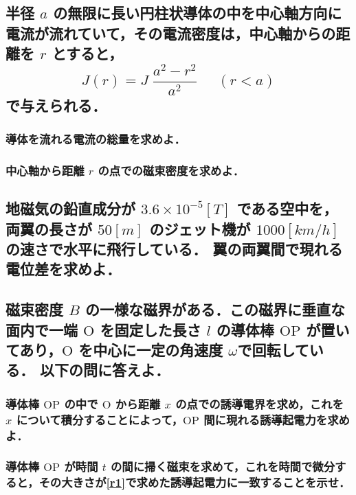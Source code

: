 \documentclass[a4paper, 12pt]{bxjsarticle}
\begin{document}
\newpage
\begin{samepage}
\subsection{半径 \(a\) の無限に長い円柱状導体の中を中心軸方向に電流が流れていて，その電流密度は，中心軸からの距離を \(r\) とすると，\[
    J(r) = J\;\frac{a^2-r^2}{a^2}\;\;\;\;\;(r < a)\]で与えられる．}
\subsubsection{導体を流れる電流の総量を求めよ．}
\vspace{10em}
\subsubsection{中心軸から距離 \(r\) の点での磁束密度を求めよ．}
\vspace{10em}
\subsection{地磁気の鉛直成分が \(3.6\times10^{-5}\si{[T]}\) である空中を，両翼の長さが \(50\si{[m]}\) のジェット機が \(1000\si{[km/h]}\) の速さで水平に飛行している．%
翼の両翼間で現れる電位差を求めよ．}
\end{samepage}
\newpage
\subsection{磁束密度 \(B\) の一様な磁界がある．この磁界に垂直な面内で一端 \(\mathrm{O}\) を固定した長さ \(l\) の導体棒 \(\mathrm{OP}\) が置いてあり，\(\mathrm{O}\) を中心に一定の角速度 \(\omega\)で回転している．%
以下の問に答えよ．}
\subsubsection{\label{r1}導体棒 \(\mathrm{OP}\) の中で \(\mathrm{O}\) から距離 \(x\) の点での誘導電界を求め，これを \(x\) について積分することによって，\(\mathrm{OP}\) 間に現れる誘導起電力を求めよ．}
\vspace{15em}
\subsubsection{導体棒 \(\mathrm{OP}\) が時間 \(t\) の間に掃く磁束を求めて，これを時間で微分すると，その大きさが\ref{r1}で求めた誘導起電力に一致することを示せ．}
\vspace{15em}
\end{document}
